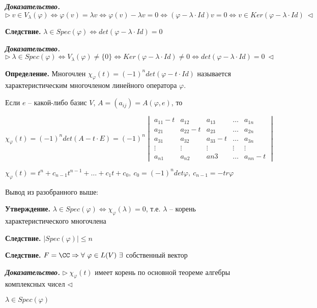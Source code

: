 \bigskip
\textbf{\textit{Доказательство.}} $\rhd \ v \in V_{\lambda} (\varphi) \Leftrightarrow \varphi (v) = \lambda v \Leftrightarrow \varphi(v) - \lambda v = 0 \Leftrightarrow (\varphi - \lambda \cdot Id) v = 0 \Leftrightarrow v \in Ker(\varphi - \lambda \cdot Id) \ \lhd$

\bigskip
\textbf{Следствие.} $\lambda \in Spec(\varphi) \Leftrightarrow det(\varphi - \lambda \cdot Id) = 0$

\bigskip
\textbf{\textit{Доказательство.}} $\rhd \ \lambda \in Spec(\varphi) \Leftrightarrow V_{\lambda} (\varphi) \neq \{0\} \Leftrightarrow Ker(\varphi - \lambda \cdot Id) \neq 0 \Leftrightarrow det (\varphi - \lambda \cdot Id) = 0 \ \lhd$

\bigskip
\textbf{Определение.} Многочлен $\chi_{\varphi} (t) = (-1)^n det (\varphi - t \cdot Id)$ называется $\textit{характеристическим многочленом}$ линейного оператора $\varphi$.

\bigskip
Если $e$ -- какой-либо базис $V$, $A = (a_{ij}) = A(\varphi, e)$, то

$\chi_{\varphi} (t) = (-1)^n det (A - t \cdot E) = (-1)^n \begin{vmatrix} a_{11} - t & a_{12} & a_{13} & \dots & a_{1n} \\
a_{21} & a_{22} - t & a_{23} & \dots & a_{2n} \\ 
a_{31} & a_{32} & a_{33} - t & \dots & a_{3n} \\
\vdots & \vdots & \vdots & \vdots & \vdots \\
a_{n1} & a_{n2} & a{n3} & \dots & a_{nn} - t \end{vmatrix}$

\bigskip
$\chi_{\varphi} (t) = t^n + c_{n-1} t^{n-1} + \dots + c_1 t + c_0, \ c_0 = (-1)^n det \varphi, \ c_{n-1} = -tr \varphi$

\bigskip
Вывод из разобранного выше:

\textbf{Утверждение.} $\lambda \in Spec(\varphi) \Leftrightarrow \chi_{\varphi} (\lambda) = 0$, т.е. $\lambda$ -- корень характеристического многочлена

\bigskip
\textbf{Следствие.} $|Spec(\varphi)| \leq n$

\bigskip
\textbf{Следствие.} $F = \CC \Rightarrow \forall \ \varphi \in L(V) \ \exists$ собственный вектор

\bigskip
\textbf{\textit{Доказательство.}} $\rhd \ \chi_{\varphi} (t)$ имеет корень по основной теореме алгебры комплексных чисел $\lhd$

\bigskip
$\lambda \in Spec(\varphi)$

